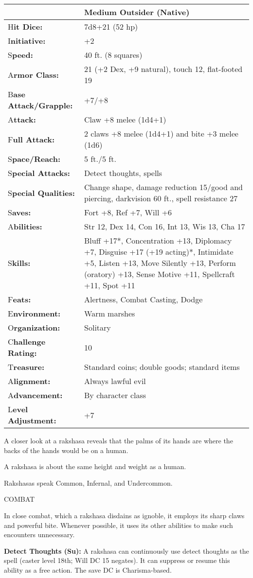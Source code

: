 \documentclass{article}
\begin{document}
\begin{tabular}{|>{\raggedright}p{91pt}|>{\raggedright}p{215pt}|}
\hline
  & Medium Outsider (Native)\tabularnewline
\hline
H\textbf{it Dice:} & 7d8+21 (52 hp)\tabularnewline
\hline
I\textbf{nitiative:} & +2\tabularnewline
\hline
S\textbf{peed:} & 40 ft. (8 squares)\tabularnewline
\hline
A\textbf{rmor Class:} & 21 (+2 Dex, +9 natural), touch 12, flat-footed 19\tabularnewline
\hline
B\textbf{ase Attack/Grapple:} & +7/+8\tabularnewline
\hline
A\textbf{ttack:} & Claw +8 melee (1d4+1)\tabularnewline
\hline
F\textbf{ull Attack:} & 2 claws +8 melee (1d4+1) and bite +3 melee (1d6)\tabularnewline
\hline
S\textbf{pace/Reach:} & 5 ft./5 ft.\tabularnewline
\hline
S\textbf{pecial Attacks:} & Detect thoughts, spells\tabularnewline
\hline
S\textbf{pecial Qualities:} & Change shape, damage reduction 15/good and piercing, 
darkvision 60 ft., spell resistance 27\tabularnewline
\hline
S\textbf{aves:} & Fort +8, Ref +7, Will +6\tabularnewline
\hline
A\textbf{bilities:} & Str 12, Dex 14, Con 16, Int 13, Wis 13, Cha 17\tabularnewline
\hline
S\textbf{kills:} & Bluff +17*, Concentration +13, Diplomacy +7, Disguise +17 (+19 
acting)*, Intimidate +5, Listen +13, Move Silently +13, Perform (oratory) +13, 
Sense Motive +11, Spellcraft +11, Spot +11\tabularnewline
\hline
F\textbf{eats:} & Alertness, Combat Casting, Dodge\tabularnewline
\hline
E\textbf{nvironment:} & Warm marshes\tabularnewline
\hline
O\textbf{rganization:} & Solitary\tabularnewline
\hline
C\textbf{hallenge Rating:} & 10\tabularnewline
\hline
T\textbf{reasure:} & Standard coins; double goods; standard items\tabularnewline
\hline
A\textbf{lignment:} & Always lawful evil\tabularnewline
\hline
A\textbf{dvancement:} & By character class\tabularnewline
\hline
L\textbf{evel Adjustment:} & +7\tabularnewline
\hline
\end{tabular}

A closer look at a rakshasa reveals that the palms of its hands are where the backs 
of the hands would be on a human.

A rakshasa is about the same height and weight as a human.

Rakshasas speak Common, Infernal, and Undercommon.

COMBAT

In close combat, which a rakshasa disdains as ignoble, it employs its sharp claws 
and powerful bite. Whenever possible, it uses its other abilities to make such 
encounters unnecessary.

\textbf{Detect Thoughts (Su): }A rakshasa can continuously use detect thoughts 
as the spell (caster level 18th; Will DC 15 negates). It can suppress or resume 
this ability as a free action. The save DC is Charisma-based.
\end{document}

